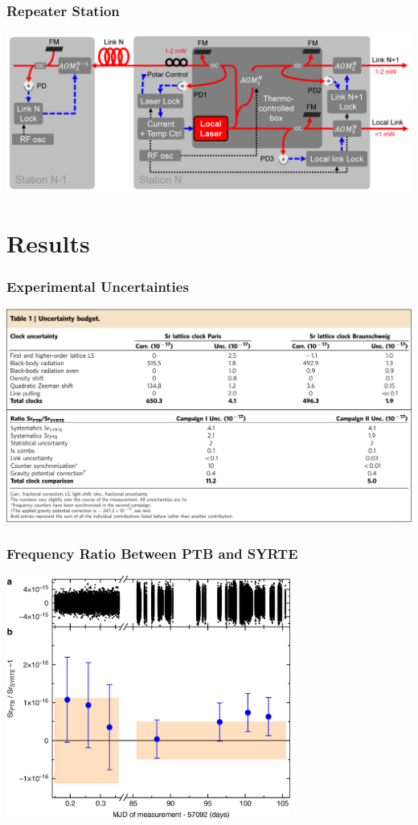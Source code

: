 \documentclass{beamer}
\begin{document}
\begin{frame}\frametitle{Repeater Station}
    \includegraphics[width=1.0\textwidth,keepaspectratio]{Images/Repeater_Schem.jpg}
   
    \cite{Chiodo2015}
\end{frame}

\section{Results} 
\begin{frame}\frametitle{Experimental Uncertainties}
    \includegraphics[width=1.0\textwidth,keepaspectratio]{Images/Uncert_Table.png}

    \cite{Lisdat2016}
\end{frame}

\begin{frame}\frametitle{Frequency Ratio Between PTB and SYRTE}
    \begin{center} 
        \includegraphics[width=0.7\textwidth,keepaspectratio]{Images/Freq_Ratio.jpg}
    \end{center} 

    \cite{Lisdat2016}
\end{frame}
\end{document}
